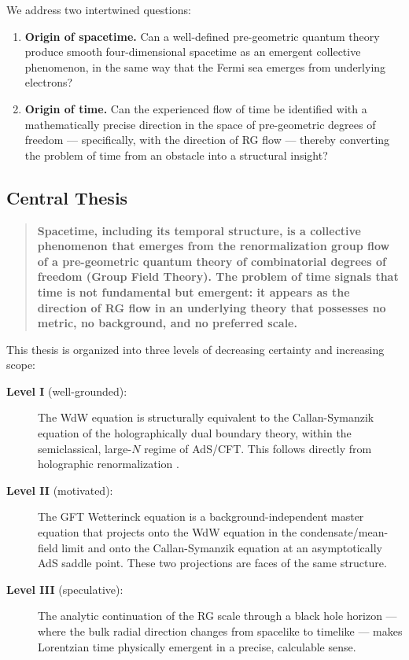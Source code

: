 \documentclass[12pt,a4paper]{article}
\begin{document}
We address two intertwined questions:
\begin{enumerate}
\item \textbf{Origin of spacetime.}
Can a well-defined pre-geometric quantum theory produce smooth
four-dimensional spacetime as an emergent collective phenomenon, in the
same way that the Fermi sea emerges from underlying electrons?
\item \textbf{Origin of time.}
Can the experienced flow of time be identified with a mathematically
precise direction in the space of pre-geometric degrees of freedom —
specifically, with the direction of RG flow — thereby converting the
problem of time from an obstacle into a structural insight?
\end{enumerate}

\subsection{Central Thesis}

\begin{quote}
\textbf{Spacetime, including its temporal structure, is a collective
phenomenon that emerges from the renormalization group flow of a
pre-geometric quantum theory of combinatorial degrees of freedom
(Group Field Theory).
The problem of time signals that time is not fundamental but emergent:
it appears as the direction of RG flow in an underlying theory that
possesses no metric, no background, and no preferred scale.}
\end{quote}

This thesis is organized into three levels of decreasing certainty and
increasing scope:

\begin{description}
\item[\textbf{Level I} (well-grounded):] The WdW equation is structurally
equivalent to the Callan-Symanzik equation of the holographically dual
boundary theory, within the semiclassical, large-$N$ regime of AdS/CFT.
This follows directly from holographic renormalization
\cite{skenderis2002,witten1998}.
\item[\textbf{Level II} (motivated):] The GFT Wetterinck equation is a
background-independent master equation that projects onto the WdW equation
in the condensate/mean-field limit and onto the Callan-Symanzik equation
at an asymptotically AdS saddle point.
These two projections are faces of the same structure.
\item[\textbf{Level III} (speculative):] The analytic continuation of
the RG scale through a black hole horizon — where the bulk radial
direction changes from spacelike to timelike — makes Lorentzian time
physically emergent in a precise, calculable sense.
\end{description}
\end{document}
